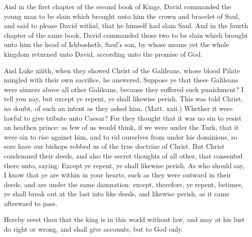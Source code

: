 And in the first chapter of the second book of Kings, 
David commanded the young man to be slain which 
brought unto him the crown and bracelet of Saul, and said 
to please David withal, that he himself had slain Saul.
And in the fourth chapter of the same book, David commanded
those two to be slain which brought unto him the 
head of Ishbosheth, Saul's son, by whose means yet the
whole kingdom returned unto David, according unto the 
promise of God.

And Luke xiiith, when they showed Christ of the
Galileans, whose blood Pilate mingled with their own 
sacrifice, he answered, Suppose ye that these Galileans 
were sinners above all other Galileans, because they suffered
such punishment? I tell you nay, but except ye 
repent, ye shall likewise perish. This was told Christ, 
no doubt, of such an intent as they asked him, (Matt.
xxii.) Whether it were lawful to give tribute unto Caesar?
For they thought that it was no sin to resist an heathen 
prince: as few of us would think, if we were under the 
Turk, that it were sin to rise against him, and to rid ourselves
from under his dominions, so sore have our bishops 
robbed us of the true doctrine of Christ. But Christ 
condemned their deeds, and also the secret thoughts of 
all other, that consented there unto, saying: Except ye 
repent, ye shall likewise perish. As who should say, I 
know that ye are within in your hearts, such as they were 
outward in their deeds, and are under the same damnation:
except, therefore, ye repent, betimes, ye shall break out 
at the last into like deeds, and likewise perish, as it came 
afterward to pass. 

Hereby seest thou that the king is in this world without 
law, and may at his lust do right or wrong, and shall give 
accounts, but to God only. 

